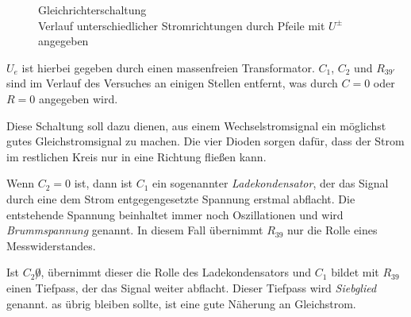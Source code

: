 \documentclass[10pt,a4paper]{scrartcl}
\begin{document}
\begin{figure}[!ht]
    \caption{Gleichrichterschaltung\\
    Verlauf unterschiedlicher Stromrichtungen durch Pfeile mit $U^\pm$ angegeben}
    \label{fig:Gleichrichter}
\end{figure}

$U_e$ ist hierbei gegeben durch einen massenfreien Transformator.
$C_1$, $C_2$ und $R_{39'}$ sind im Verlauf des Versuches an einigen Stellen
entfernt, was durch $C=0$ oder $R=0$ angegeben wird.

Diese Schaltung soll dazu dienen, aus einem Wechselstromsignal ein möglichst
gutes Gleichstromsignal zu machen.
Die vier Dioden sorgen dafür, dass der Strom im restlichen Kreis nur in eine
Richtung fließen kann.

Wenn $C_2=0$ ist, dann ist $C_1$ ein sogenannter \emph{Ladekondensator},
der das Signal durch eine dem Strom entgegengesetzte Spannung erstmal abflacht.
Die entstehende Spannung beinhaltet immer noch Oszillationen und wird
\emph{Brummspannung} genannt.
In diesem Fall übernimmt $R_{39}$ nur die Rolle eines Messwiderstandes.

Ist $C_2\not0$, übernimmt dieser die Rolle des Ladekondensators
und $C_1$ bildet mit $R_{39}$ einen Tiefpass, der das Signal weiter abflacht.
Dieser Tiefpass wird \emph{Siebglied} genannt.
as übrig bleiben sollte, ist eine gute Näherung an Gleichstrom.
\end{document}
